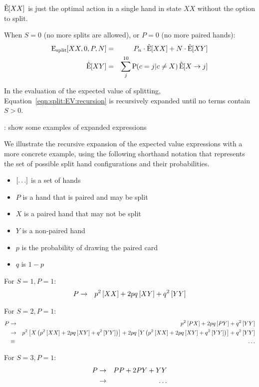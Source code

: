 \noindent
$\hat{\textrm{E}}\hspace{-.5ex}\left[XX\right]$ is just the optimal action in a single hand in state $XX$
without the option to split.

When $S=0$ (no more splits are allowed), or $P=0$ (no more paired hands):
\begin{eqnarray}
\textrm{E}_{\textrm{split}}\hspace{-.5ex}\left[XX,0,P,N\right] &=& P_n\cdot\hat{\textrm{E}}\hspace{-.5ex}\left[XX\right] +N\cdot\hat{\textrm{E}}\hspace{-.5ex}\left[XY\right]\\
\hat{\textrm{E}}\hspace{-.5ex}\left[XY\right] &=& \sum_{j}^{10}{\textrm{P}\hspace{-.5ex}\left(c=j|c\neq{}X\right) \hat{\textrm{E}}\hspace{-.5ex}\left[X\rightarrow{}j\right]}
\end{eqnarray}

In the evaluation of the expected value of splitting, 
Equation~\ref{eqn:split:EV:recursion} is recursively expanded until
no terms contain $S>0$.

\TODO: show some examples of expanded expressions

We illustrate the recursive expansion of the expected value expressions 
with a more concrete example, 
using the following shorthand notation that represents the 
set of possible split hand configurations and their probabilities.

\begin{itemize}
\item $\left[\ldots\right]$ is a set of hands
\item $P$ is a hand that is paired and may be split
\item $X$ is a paired hand that may not be split
\item $Y$ is a non-paired hand
\item $p$ is the probability of drawing the paired card
\item $q$ is $1-p$
\end{itemize}

For $S=1,P=1$:
\begin{eqnarray}
P &\rightarrow& p^2 \left[XX\right] +2pq \left[XY\right] +q^2 \left[YY\right]
\end{eqnarray}

For $S=2,P=1$:
\begin{eqnarray}
P &\rightarrow& p^2\left[PX\right] +2pq\left[PY\right] +q^2\left[YY\right] \\
&\rightarrow& p^2\left[X\left(p^2\left[XX\right] +2pq\left[XY\right] +q^2\left[YY\right]\right)\right]
 +2pq\left[Y\left(p^2\left[XX\right] +2pq\left[XY\right] +q^2\left[YY\right]\right)\right]
 +q^2\left[YY\right] \\
&\equiv& \ldots
\end{eqnarray}

For $S=3,P=1$:
\begin{eqnarray}
P &\rightarrow& PP +2PY +YY \\
&\rightarrow& \ldots
\end{eqnarray}


